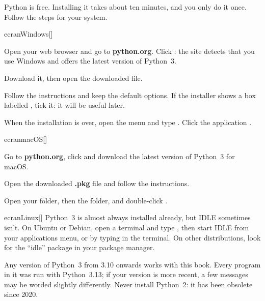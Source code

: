 
Python is free. Installing it takes about ten minutes, and you only do it once. Follow the steps for
your system.

\begin{encadre}{ecran}{Windows}[]
\begin{etapes}
\item Open your web browser and go to \textbf{python.org}. Click : the site detects
  that you use Windows and offers the latest version of Python~3.
\item Download it, then open the downloaded file.
\item Follow the instructions and keep the default options. If the installer shows a box labelled
  , tick it: it will be useful later.
\item When the installation is over, open the  menu and type . Click the
  application .
\end{etapes}
\end{encadre}

\begin{encadre}{ecran}{macOS}[]
\begin{etapes}
\item Go to \textbf{python.org}, click  and download the latest version of Python~3
  for macOS.
\item Open the downloaded \textbf{.pkg} file and follow the instructions.
\item Open your  folder, then the  folder, and double-click
  .
\end{etapes}
\end{encadre}

\begin{encadre}{ecran}{Linux}[]
Python~3 is almost always installed already, but IDLE sometimes isn't. On Ubuntu or Debian, open a
terminal and type , then start IDLE from your applications menu, or by
typing  in the terminal. On other distributions, look for the \enquote{idle} package in
your package manager.
\end{encadre}

\begin{astuce}
Any version of Python~3 from 3.10 onwards works with this book. Every program in it was run with
Python~3.13; if your version is more recent, a few messages may be worded slightly differently.
Never install Python~2: it has been obsolete since 2020.
\end{astuce}


